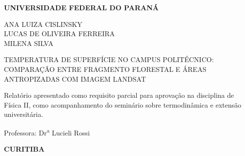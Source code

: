 \documentclass[
12pt,			%
openany,		%
oneside,		%
a4paper,		%
sumario=tradicional,
chapter=TITLE,
section=TITLE,
subsection=Title,
brazil,			%
]{abntex2}
\begin{document}
	
	\frenchspacing
	
	
	\thispagestyle{empty}
	\begin{center}
		\textbf{UNIVERSIDADE FEDERAL DO PARANÁ}
		
		\vspace{2.5cm}
		\uppercase {
			Ana Luiza Cislinsky \\
			Lucas de Oliveira Ferreira \\
			Milena Silva
		}
		\vspace{2.5cm}

		
		\vspace{3cm}
		\uppercase{Temperatura de superfície no campus Politécnico: comparação entre fragmento florestal e áreas antropizadas com imagem Landsat}
	\end{center}
	
	\vspace{1cm}
	\noindent\hspace{0.45\textwidth}
	\begin{minipage}{0.50\textwidth}
		Relatório apresentado como requisito parcial para aprovação na disciplina de Física II, como acompanhamento do seminário sobre termodinâmica e extensão universitária.
		
		\bigskip
		Professora: Dr\textsuperscript{a} Lucieli Rossi
	\end{minipage}
	
	\vfill
	\begin{center}
		\textbf{CURITIBA}\\
		\the\year
	\end{center}
	\newpage
	
\end{document}
